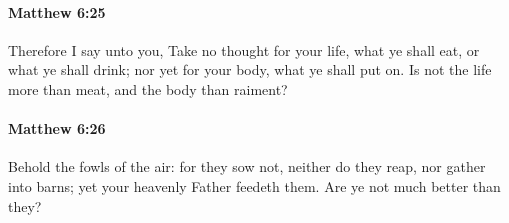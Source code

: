 		\paragraph{Matthew 6:25} %
			\label{MATTHEW-6-25}

			Therefore I say unto you, Take no thought for your life, what ye shall eat, or what ye shall drink; nor yet for your body, what ye shall put on. Is not the life more than meat, and the body than raiment?

			\begin{framed}
			\scriptsize
				\begin{compactdesc}
					\item[SBLG] 
				\end{compactdesc}
			\end{framed}

		\paragraph{Matthew 6:26} %
			\label{MATTHEW-6-26}

			Behold the fowls of the air: for they sow not, neither do they reap, nor gather into barns; yet your heavenly Father feedeth them. Are ye not much better than they?

